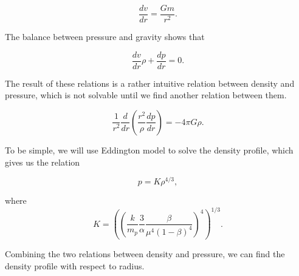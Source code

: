 \documentclass{tufte-handout}
\begin{document}
\begin{equation*}
    \frac{dv}{dr} = \frac{G m}{r^2}.
\end{equation*}

The balance between pressure and gravity shows that

\begin{equation*}
    \frac{dv}{dr} \rho + \frac{dp}{dr} = 0.
\end{equation*}

The result of these relations is a rather intuitive relation between density and pressure, which is not solvable until we find another relation between them.

\begin{equation*}
    \frac{1}{r^2} \frac{d}{dr} \left( \frac{r^2}{\rho} \frac{dp}{dr} \right) = -4\pi G\rho.
\end{equation*}

To be simple, we will use Eddington model to solve the density profile, which gives us the relation

\begin{equation*}
    p = K \rho^{4/3},
\end{equation*}


where 
\begin{equation*}
    K = \left(  \left( \frac{k}{m_p} \frac{3}{\alpha} \frac{\beta}{\mu^4(1-\beta)^4}  \right)^4  \right)^{1/3}.
\end{equation*}

Combining the two relations between density and pressure, we can find the density profile with respect to radius.
\end{document}

